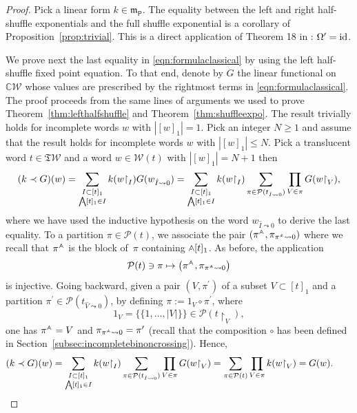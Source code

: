 \documentclass[pdftex]{sigma}
\renewcommand{\restriction}[2]{{#1\mathbin{\upharpoonright}_{#2}}}
\newcommand{\translucidation}[2]{{{#1}_{#2\leadsto0}}}
\newcommand{\bigwedgedots}{{\mathop{\bigwedge\hspace{-6.5pt}\raisebox{-1.5pt}[0pt][0pt]{$\cdot$}\hspace{2pt}}\nolimits}}
\newcommand{\wedgedotb}{{\mathop{\wedge\hspace{-5.2pt}\raisebox{-1pt}[0pt][0pt]{$\cdot$}\hspace{2pt}}\nolimits}}
\newcommand{\wedgedot}{{\mathop{\wedge\hspace{-4.2pt}\raisebox{-1pt}[0pt][0pt]{$\cdot$}\hspace{2pt}}\nolimits}}
\newcommand{\wedgedots}{{\mathop{\wedge\hspace{-4pt}\raisebox{-1.5pt}[0pt][0pt]{$\cdot$}\hspace{1pt}}\nolimits}}
\newcommand{\SWc}{{\mathfrak{T}\mathcal{W}}}
\newcommand\IWc{\mathcal{W}}
\newcommand{\BPc}{{\mathcal{P}}}
\def\CC{\mathbb{C}}
\newcommand{\shalII}{{\mathfrak m}_{\mathsf P}}
\numberwithin{equation}{section}
\begin{document}
\begin{proof}
	Pick a linear form $k\in\shalII$. The equality between the left and right half-shuffle exponentials and the full shuffle exponential is a corollary of Proposition~\ref{prop:trivial}. This is a direct application of Theorem 18 in \cite{EbrahimiFardPatras2019applications}: $\Omega^{\prime}={\rm id}$.

 We prove next the last equality in \eqref{eqn:formulaclassical} by using the left half-shuffle fixed point equation. To that end, denote by $G$ the linear functional on $\CC \IWc$ whose values are prescribed by the rightmost terms in \eqref{eqn:formulaclassical}. The proof proceeds from the same lines of arguments we used to prove Theorem~\ref{thm:lefthalfshuffle} and Theorem~\ref{thm:shuffleexpo}.
	The result trivially holds for incomplete words $w$ with $|[w]_1| = 1$. Pick an integer $N\geq 1$ and assume that the result holds for incomplete words $w$ with $|[w]_1| \leq N$. Pick a translucent word $t\in\SWc$ and a word $w \in \IWc(t)$ with $|[w]_1| = N+1$ then
	\begin{equation*}%
		(k \prec G)(w) = \sum_{\substack{I\subset [t]_1 \\ \bigwedgedots [t]_1 \in I}} k(\restriction{w}{I}) G(\translucidation{w}{ \hat{I}}) = \sum_{\substack{I \subset [t]_1 \\ \bigwedgedots [t]_1 \in I }} k(\restriction{w}{I})\sum_{\pi\in\BPc(\translucidation{t}{\hat{I}})} \prod_{V\in \pi} G(\restriction{w}{V}),
	\end{equation*}
	where we have used the inductive hypothesis on the word $\translucidation{w}{\hat{I}} $ to derive the last equality. To a partition $\pi \in \BPc(t)$, we associate the pair $(\pi^{\wedgedot}, \translucidation{\pi}{\pi^{\wedgedots}})$ where we recall that $\pi^{\wedgedot}$ is the block of~$\pi$ containing $\wedgedotb[t]_1$. As before, the application
	\[
	\mathcal{P}(t)\ni \pi \mapsto \big(\pi^{\wedgedot}, \translucidation{\pi}{\pi^{\wedgedots}}\big)
	\]
	is injective. Going backward, given a pair $(V,\pi^{\prime})$ of a subset $V\subset [t]_1$ and a partition $\pi^{\prime} \in \BPc(\translucidation{t}{\hat{V}})$, by defining $\pi := 1_{V} \circ \pi^{\prime} $, where \[1_{V} = \{\{1,\dots,|V|\}\} \in \BPc(\restriction{t}{V}),\] one has $\pi^{\wedgedot} = V$ and $\translucidation{\pi}{\pi^{\wedgedots}}=\pi^{\prime}$ (recall that the composition $\circ$ has been defined in Section~\ref{subsec:incompletebinoncrossing}). Hence,
	\begin{align*}
		(k\prec G)(w) = \sum_{\substack{I \subset [t]_1 \\ \bigwedgedots [t]_1 \in I }} k(\restriction{w}{I})\sum_{\pi\in\BPc(\translucidation{t}{ \hat{I}})} \prod_{V\in \pi} G(\restriction{w}{V}) = \sum_{\pi \in \BPc(t)} \prod_{V\in\pi} k(\restriction{w}{V}) = G(w).\tag*{\qed}
	\end{align*}\renewcommand{\qed}{}
\end{proof}
\end{document}
